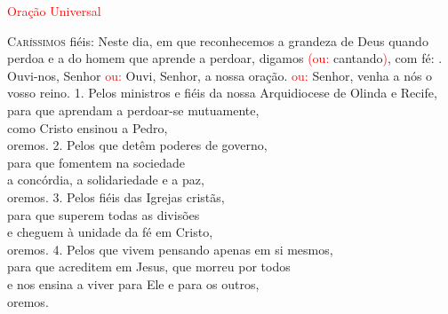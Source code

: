 \documentclass{book}
\begin{document}
\pagestyle{empty}
\begin{center}
    \textcolor{red}{Oração Universal}
    \vspace{.2cm} \\
\end{center}
\lettrine[findent=2pt]{\color{red}C}{aríssimos} fiéis:
\newline
Neste dia, em que reconhecemos
\newline
a grandeza de Deus quando perdoa
\newline
e a do homem que aprende a perdoar,
\newline
digamos \textcolor{red}{(ou:} cantando\textcolor{red}{)}, com fé:
\vspace{.2cm}
\newline
{\color{red} \Rbar.} Ouvi-nos, Senhor
\newline
\textcolor{red}{ou:}  Ouvi, Senhor, a nossa oração.
\newline
\textcolor{red}{ou:}  Senhor, venha a nós o vosso reino.
\vspace{.2cm}
\newline
{\color{red} 1.} Pelos ministros e fiéis da nossa Arquidiocese de Olinda e Recife, \\
para que aprendam a perdoar-se mutuamente, \\
como Cristo ensinou a Pedro, \\
oremos.
\vspace{.1cm}
\newline
{\color{red} 2.} Pelos que detêm poderes de governo, \\
para que fomentem na sociedade \\
a concórdia, a solidariedade e a paz, \\
oremos.
\vspace{.1cm}
\newline
{\color{red} 3.}  Pelos fiéis das Igrejas cristãs, \\
para que superem todas as divisões \\
e cheguem à unidade da fé em Cristo, \\
oremos.
\vspace{.1cm}
\newline
{\color{red} 4.}  Pelos que vivem pensando apenas em si mesmos, \\
para que acreditem em Jesus, que morreu por todos \\
e nos ensina a viver para Ele e para os outros, \\
oremos.
\vspace{.1cm}
\end{document}
